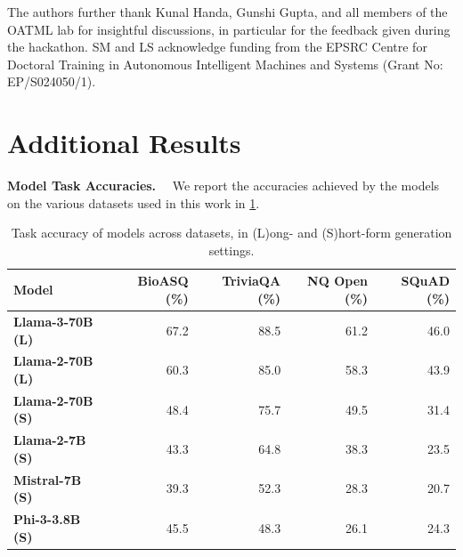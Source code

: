 \documentclass{article}
\renewcommand{\paragraph}[1]{\textbf{#1}~~}
\begin{document}
The authors further thank Kunal Handa, Gunshi Gupta, and all members of the OATML lab for insightful discussions, in particular for the feedback given during the hackathon.
SM and LS acknowledge funding from the EPSRC Centre for Doctoral Training in Autonomous Intelligent Machines and Systems (Grant No: EP/S024050/1).



{\small


}

\newpage
\FloatBarrier
\appendix
{}


\section{Additional Results}
\vspace{-1mm}

\paragraph{Model Task Accuracies.} We report the accuracies achieved by the models on the various datasets used in this work in \cref{tab:accuracy_table}.

\begin{table}[ht]
    \centering
    \vspace{-10pt}
    \caption{Task accuracy of models across datasets, in (L)ong- and (S)hort-form generation settings.}
    \vspace{0.5em}
    \label{tab:accuracy_table}
    \begin{tabular}{lrrrr}
        \toprule
        \textbf{Model} & \textbf{BioASQ (\%)} & \textbf{TriviaQA (\%)} & \textbf{NQ Open (\%)} & \textbf{SQuAD (\%)} \\
        \midrule
        \textbf{Llama-3-70B (L)} & 67.2 & 88.5 & 61.2 & 46.0 \\
        \textbf{Llama-2-70B (L)} & 60.3 & 85.0 & 58.3 & 43.9 \\
        \textbf{Llama-2-70B (S)} & 48.4 & 75.7 & 49.5 & 31.4 \\
        \textbf{Llama-2-7B (S)} & 43.3 & 64.8 & 38.3 & 23.5 \\
        \textbf{Mistral-7B (S)} & 39.3 & 52.3 & 28.3 & 20.7 \\
        \textbf{Phi-3-3.8B (S)} & 45.5 & 48.3 & 26.1 & 24.3 \\
        \bottomrule
    \end{tabular}
    \vspace{-5pt}
\end{table}
\end{document}
